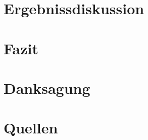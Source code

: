 \documentclass[11pt, titlepage, parskip=half-]{scrreprt}
\begin{document}
\chapter{Ergebnissdiskussion}

\chapter{Fazit}

\newpage
\chapter{Danksagung}

\chapter{Quellen}



\end{document}
